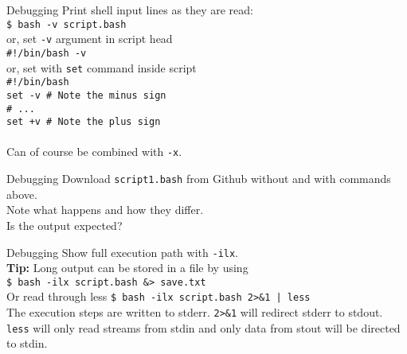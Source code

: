 \documentclass{beamer}
\let\tt\texttt
\let\bf\textbf
\begin{document}
\begin{frame}{Debugging}
    Print shell input lines as they are read:   \\
    \tt{\$ bash -v script.bash}     \\
    or, set \tt{-v} argument in script head \\
    \tt{\#!/bin/bash -v}            \\
    or, set with \tt{set} command inside script \\
    \tt{\#!/bin/bash}               \\
    \tt{set -v  \# Note the minus sign}  \\
    \tt{\# ...}                          \\
    \tt{set +v  \# Note the plus sign}   \\
    \quad                           \\
    Can of course be combined with \tt{-x}.
\end{frame}

\begin{frame}{Debugging}
    Download \tt{script1.bash} from Github without and with commands above. \\
    Note what happens and how they differ.      \\
    Is the output expected?                     \\
\end{frame}

\begin{frame}{Debugging}
    Show full execution path with \tt{-ilx}.    \\
    \bf{Tip:} Long output can be stored in a file by using  \\
    \quad \tt{\$ bash -ilx script.bash \&> save.txt}         \\
    Or read through less
    \quad \tt{\$ bash -ilx script.bash 2>\&1 | less}         \\
    The execution steps are written to stderr. \tt{2>\&1} will redirect stderr to stdout. \tt{less} will only read streams from stdin and only data from stout will be directed to stdin.
\end{frame}
\end{document}

